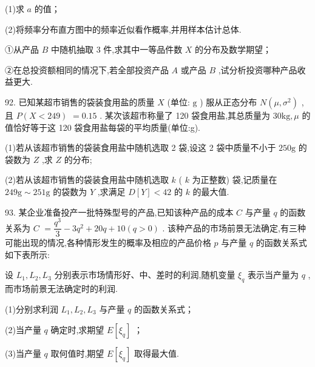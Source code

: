 (1)求 $a$ 的值；

(2)将频率分布直方图中的频率近似看作概率,并用样本估计总体.

①从产品 $B$ 中随机抽取 3 件,求其中一等品件数 $X$ 的分布及数学期望；

②在总投资额相同的情况下,若全部投资产品 $A$ 或产品 $B$ ,试分析投资哪种产品收益更大.

92. 已知某超市销售的袋装食用盐的质量 $X$ (单位: $\mathrm{g}$ ) 服从正态分布 $N\left( {\mu ,{\sigma }^{2}}\right)$ ,且 $P\left( {X < {249}}\right)$  $= {0.15}$ . 某次该超市称量了 120 袋食用盐,其总质量为 ${30}\mathrm{{kg}},\mu$ 的值恰好等于这 120 袋食用盐每袋的平均质量(单位:g).

(1)若从该超市销售的袋装食用盐中随机选取 2 袋,设这 2 袋中质量不小于 ${250}\mathrm{g}$ 的袋数为 $Z$ ,求 $Z$ 的分布;

(2)若从该超市销售的袋装食用盐中随机选取 $k$ ( $k$ 为正整数) 袋,记质量在 ${249}\mathrm{g} \sim  {251}\mathrm{g}$ 的袋数为 $Y$ ,求满足 $D\left\lbrack  Y\right\rbrack   < {42}$ 的 $k$ 的最大值.

93. 某企业准备投产一批特殊型号的产品,已知该种产品的成本 $C$ 与产量 $q$ 的函数关系为 $C$  $= \dfrac{{q}^{3}}{3} - 3{q}^{2} + {20q} + {10}\left( {q > 0}\right)$ . 该种产品的市场前景无法确定,有三种可能出现的情况,各种情形发生的概率及相应的产品价格 $p$ 与产量 $q$ 的函数关系式如下表所示:

\begin{center}
\end{center}

设 ${L}_{1},{L}_{2},{L}_{3}$ 分别表示市场情形好、中、差时的利润,随机变量 ${\xi }_{q}$ 表示当产量为 $q$ ,而市场前景无法确定时的利润.

(1)分别求利润 ${L}_{1},{L}_{2},{L}_{3}$ 与产量 $q$ 的函数关系式；

(2)当产量 $q$ 确定时,求期望 $E\left\lbrack  {\xi }_{q}\right\rbrack$ ；

(3)当产量 $q$ 取何值时,期望 $E\left\lbrack  {\xi }_{q}\right\rbrack$ 取得最大值.

